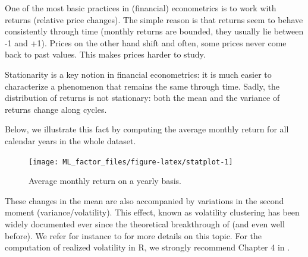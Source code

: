 \documentclass[]{krantz}
\makeatletter
\newenvironment{Shaded}{\begin{snugshade}}{\end{snugshade}}
\newcommand{\CommentTok}[1]{\textcolor[rgb]{0.37,0.37,0.37}{\textit{#1}}}
\newcommand{\DataTypeTok}[1]{\textcolor[rgb]{0.27,0.27,0.27}{#1}}
\newcommand{\KeywordTok}[1]{\textcolor[rgb]{0.27,0.27,0.27}{\textbf{#1}}}
\newcommand{\NormalTok}[1]{#1}
\newcommand{\OperatorTok}[1]{\textcolor[rgb]{0.43,0.43,0.43}{\textbf{#1}}}
\newcommand{\StringTok}[1]{\textcolor[rgb]{0.5,0.5,0.5}{#1}}
\newenvironment{kframe}{%
\medskip{}
\setlength{\fboxsep}{.8em}
 \def\at@end@of@kframe{}%
 \ifinner\ifhmode%
  \def\at@end@of@kframe{\end{minipage}}%
  \begin{minipage}{\columnwidth}%
 \fi\fi%
 \def\FrameCommand##1{\hskip\@totalleftmargin \hskip-\fboxsep
 \colorbox{shadecolor}{##1}\hskip-\fboxsep
     \hskip-\linewidth \hskip-\@totalleftmargin \hskip\columnwidth}%
 \MakeFramed {\advance\hsize-\width
   \@totalleftmargin\z@ \linewidth\hsize
   \@setminipage}}%
 {\par\unskip\endMakeFramed%
 \at@end@of@kframe}
\renewenvironment{Shaded}{\begin{kframe}}{\end{kframe}}
\theoremstyle{definition}
\theoremstyle{definition}
\theoremstyle{definition}
\theoremstyle{remark}
\makeatother
\begin{document}
One of the most basic practices in (financial) econometrics is to work
with returns (relative price changes). The simple reason is that returns
seem to behave consistently through time (monthly returns are bounded,
they usually lie between -1 and +1). Prices on the other hand shift and
often, some prices never come back to past values. This makes prices
harder to study.

Stationarity is a key notion in financial econometrics: it is much
easier to characterize a phenomenon that remains the same through time.
Sadly, the distribution of returns is not stationary: both the mean and
the variance of returns change along cycles.

Below, we illustrate this fact by computing the average monthly return
for all calendar years in the whole dataset.

\footnotesize

\begin{Shaded}
\end{Shaded}

\begin{figure}[H]

{\centering \texttt{[image: ML\_factor\_files/figure-latex/statplot-1]} 

}

\caption{Average monthly return on a yearly basis.}\label{fig:statplot}
\end{figure}

\normalsize

These changes in the mean are also accompanied by variations in the
second moment (variance/volatility). This effect, known as volatility
clustering has been widely documented ever since the theoretical
breakthrough of \citet{engle1982autoregressive} (and even well before).
We refer for instance to \citet{cont2007volatility} for more details on
this topic. For the computation of realized volatility in R, we strongly
recommend Chapter 4 in \citet{regenstein2018reproducible}.
\end{document}
